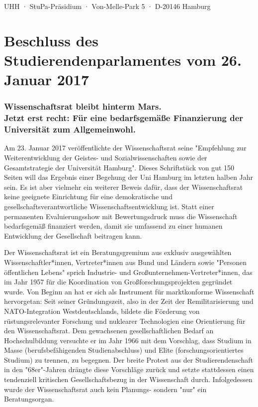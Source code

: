 \documentclass[ngerman,headheight=70pt]{scrartcl}
\begin{document}
    UHH · StuPa-Präsidium · Von-Melle-Park 5 · D-20146 Hamburg

    \section*{Beschluss des Studierendenparlamentes vom 26. Januar 2017}
    \subsubsection*{Wissenschaftsrat bleibt hinterm Mars.\\
    Jetzt erst recht: Für eine bedarfsgemäße Finanzierung der
    Universität zum Allgemeinwohl.}

    Am 23. Januar 2017 veröffentlichte der Wissenschaftsrat seine "Empfehlung
    zur Weiterentwicklung der Geistes- und Sozialwissenschaften sowie der
    Gesamtstrategie der Universität Hamburg". Dieses Schriftstück von gut 150
    Seiten will das Ergebnis einer Begehung der Uni Hamburg im letzten halben
    Jahr sein. Es ist aber vielmehr ein weiterer Beweis dafür, dass der
    Wissenschaftsrat keine geeignete Einrichtung für eine demokratische und
    gesellschaftsverantwortliche Wissenschaftsentwicklung ist. Statt einer
    permanenten Evaluierungsshow mit Bewertungsdruck muss die Wissenschaft
    bedarfsgemäß finanziert werden, damit sie umfassend zu einer humanen
    Entwicklung der Gesellschaft beitragen kann.

    Der Wissenschaftsrat ist ein Beratungsgremium aus exklusiv ausgewählten
    Wissenschaftler*innen, Vertreter*innen aus Bund und Ländern sowie "Personen
    öffentlichen Lebens" sprich Industrie- und Großunternehmen-Vertreter*innen,
    das im Jahr 1957 für die Koordination von Großforschungsprojekten gegründet
    wurde. Von Beginn an hat er sich als Instrument für marktkonforme Wissenschaft
    hervorgetan: Seit seiner Gründungszeit, also in der Zeit der Remilitarisierung
    und NATO-Integration Westdeutschlands, bildete die Förderung von rüstungsrelevanter
    Forschung und nuklearer Technologien eine Orientierung für den Wissenschaftsrat.
    Dem gewachsenen gesellschaftlichen Bedarf an Hochschulbildung versuchte er im
    Jahr 1966 mit dem Vorschlag, dass Studium in Masse (berufsbefähigenden
    Studienabschluss) und Elite (forschungsorientiertes Studium) zu trennen, zu
    begegnen. Der breite Protest aus der Studierendenschaft in den "68er"-Jahren
    drängte diese Vorschläge zurück und setzte stattdessen einen tendenziell
    kritischen Gesellschaftsbezug in der Wissenschaft durch. Infolgedessen wurde
    der Wissenschaftsrat auch kein Planungs- sondern "nur" ein Beratungsorgan.
\end{document}
